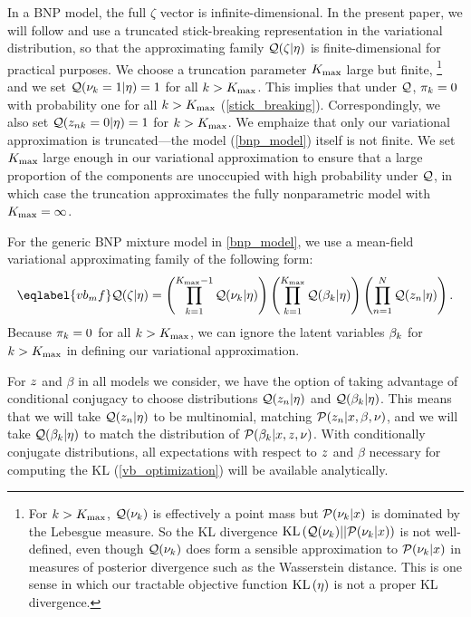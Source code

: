 In a BNP model, the full $\zeta$ vector is infinite-dimensional. In the present
paper, we will follow \citet{blei:2006:vi_for_dp} and use a truncated
stick-breaking representation in the variational distribution, so that the
approximating family $\mathcal{Q}(\zeta \vert \eta)$ is finite-dimensional for practical
purposes. We choose a truncation parameter ${K_{\mathrm{max}}}$ large but finite,
%
\footnote{For $k > {K_{\mathrm{max}}}$, $\mathcal{Q}(\nu_k)$ is effectively a point mass  but
$\mathcal{P}(\nu_k \vert x)$ is dominated by the Lebesgue measure.  So the KL
divergence $\mathrm{KL}\left(\mathcal{Q}(\nu_k) || \mathcal{P}(\nu_k \vert x)\right)$ is not well-defined, even
though $\mathcal{Q}(\nu_k)$ does form a sensible approximation to $\mathcal{P}(\nu_k \vert x)$
in measures of posterior divergence such as the Wasserstein distance.  This is
one sense in which our tractable objective function $\mathrm{KL}\left(\eta\right)$ is not a proper
KL divergence. }
%
and we set $\mathcal{Q}(\nu_k = 1 | \eta) =
1$ for all $k > {K_{\mathrm{max}}}$. This implies that under $\mathcal{Q}$, $\pi_k = 0$ with
probability one for all $k > {K_{\mathrm{max}}}$ (\eqref{stick_breaking}). Correspondingly,
we also set $\mathcal{Q}(z_{nk} = 0 | \eta) = 1$ for $k > {K_{\mathrm{max}}}$.
%
We emphaize that only our variational approximation is truncated---the model
(\eqref{bnp_model}) itself is not finite. We set ${K_{\mathrm{max}}}$ large enough in our
variational approximation to ensure that a large proportion of the components
are unoccupied with high probability under $\mathcal{Q}$, in which case the truncation
approximates the fully nonparametric model with ${K_{\mathrm{max}}} = \infty$.

For the generic BNP mixture model in \eqref{bnp_model}, we use a mean-field
variational approximating family of the following form:
%
\begin{align}\eqlabel{vb_mf}
%
\q(\zeta \vert \eta) =
    \left( \prod_{\k=1}^{\kmax - 1} \q(\nuk \vert \eta) \right)
    \left( \prod_{\k=1}^{\kmax} \q(\beta_\k \vert \eta) \right)
    \left( \prod_{\n=1}^{\N} \q(\z_{\n} \vert \eta) \right).
%
\end{align}
%
Because $\pi_k = 0$ for all $k > {K_{\mathrm{max}}}$, we can ignore the latent variables
$\beta_k$ for $k > {K_{\mathrm{max}}}$ in defining our variational approximation.


For $z$ and $\beta$ in all models we consider, we have the option of taking
advantage of conditional conjugacy to choose distributions $\mathcal{Q}(z_n \vert
\eta)$ and $\mathcal{Q}(\beta_k \vert \eta)$. This means that we will take $\mathcal{Q}(z_n
\vert \eta)$ to be multinomial, matching $\mathcal{P}(z_{n} \vert x, \beta, \nu)$, and
we will take $\mathcal{Q}(\beta_k \vert \eta)$ to match the distribution of
$\mathcal{P}(\beta_{k} \vert x, z, \nu)$. With conditionally conjugate distributions,
all expectations with respect to $z$ and $\beta$ necessary for computing the
$\mathrm{KL}$ (\eqref{vb_optimization}) will be available analytically.

